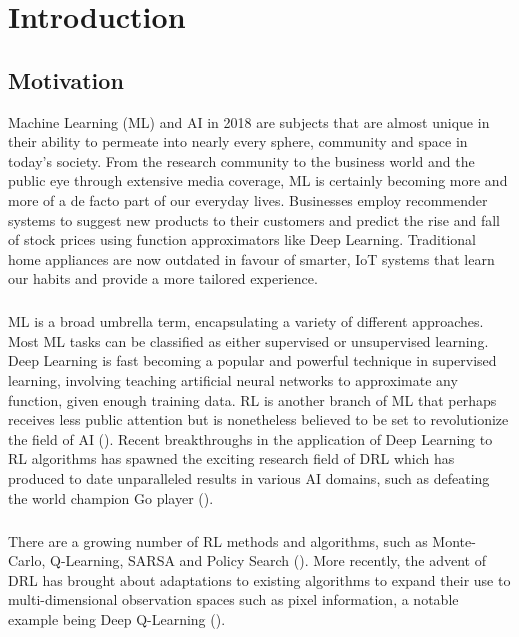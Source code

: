 \chapter{Introduction}

\section{Motivation}
Machine Learning (ML) and AI in 2018 are subjects that are almost unique in their ability to permeate into nearly every sphere, community and space in today's society. From the research community to the business world and the public eye through extensive media coverage, ML is certainly becoming more and more of a de facto part of our everyday lives. Businesses employ recommender systems to suggest new products to their customers and predict the rise and fall of stock prices using function approximators like Deep Learning. Traditional home appliances are now outdated in favour of smarter, IoT systems that learn our habits and provide a more tailored experience. \paragraph{}

ML is a broad umbrella term, encapsulating a variety of different approaches. Most ML tasks can be classified as either supervised or unsupervised learning. Deep Learning is fast becoming a popular and powerful technique in supervised learning, involving teaching artificial neural networks to approximate any function, given enough training data. RL is another branch of ML that perhaps receives less public attention but is nonetheless believed to be set to revolutionize the field of AI (\citet{survey-drl}). Recent breakthroughs in the application of Deep Learning to RL algorithms has spawned the exciting research field of DRL which has produced to date unparalleled results in various AI domains, such as defeating the world champion Go player (\citet{44806}). \paragraph{}

There are a growing number of RL methods and algorithms, such as Monte-Carlo, Q-Learning, SARSA and Policy Search (\citet{sutton1998reinforcement}). More recently, the advent of DRL has brought about adaptations to existing algorithms to expand their use to multi-dimensional observation spaces such as pixel information, a notable example being Deep Q-Learning (\citet{deepmind1}). \paragraph{}

